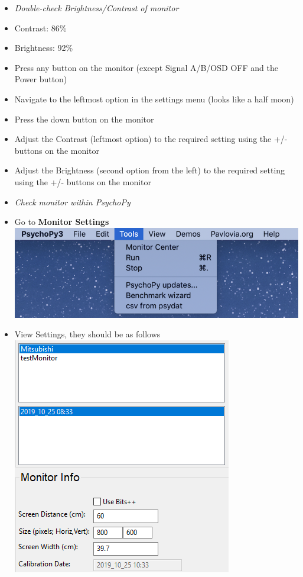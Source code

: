 \documentclass[]{article}
\begin{document}
\begin{itemize}
\item
  \emph{Double-check Brightness/Contrast of monitor}
\item
  Contrast: 86\%\\
\item
  Brightness: 92\%
\item
  Press any button on the monitor (except Signal A/B/OSD OFF and the
  Power button)
\item
  Navigate to the leftmost option in the settings menu (looks like a
  half moon)
\item
  Press the down button on the monitor
\item
  Adjust the Contrast (leftmost option) to the required setting using
  the +/- buttons on the monitor
\item
  Adjust the Brightness (second option from the left) to the required
  setting using the +/- buttons on the monitor
\item
  \emph{Check monitor within PsychoPy}\\
\item
  Go to \textbf{Monitor Settings}\\
  \includegraphics{images/pp2.png}\\
\item
  View Settings, they should be as follows\\
  \includegraphics{images/pp3.PNG}
\end{itemize}
\end{document}
